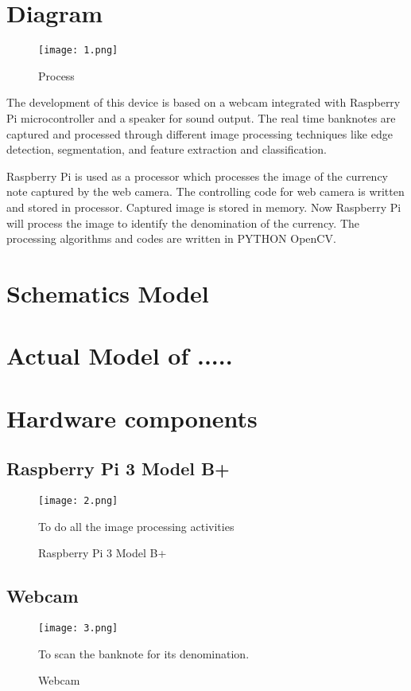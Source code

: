 \documentclass[a4paper,12pt]{report}
\begin{document}
\section{Diagram}
\begin{figure}[h]
	\centering
	\texttt{[image: 1.png]}
	\caption{\label{fig.1}Process}
\end{figure}
The development of this device is based on a webcam integrated with Raspberry Pi microcontroller and a speaker for sound output. The real time banknotes are captured and processed through different image processing techniques like edge detection, segmentation, and feature extraction and classification.

Raspberry Pi is used as a processor which processes the image of the currency note captured by the web camera. The controlling code for web camera is written and stored in processor. Captured image is stored in memory. Now Raspberry Pi will process the image to identify the denomination of the currency. The processing algorithms and codes are written in PYTHON OpenCV.  	

\section{Schematics Model}	

\section{Actual Model of .....}	 

 \clearpage \section{Hardware components} 
\subsection{Raspberry Pi 3 Model B+}
\begin{figure}[h]
	\centering
	\texttt{[image: 2.png]}
	\caption{\label{fig.2}Raspberry Pi 3 Model B+} 
	To do all the image processing activities
\end{figure}
\subsection{Webcam}
\begin{figure}[h]
	\centering
	\texttt{[image: 3.png]}
	\caption{\label{fig.3}Webcam} 
	To scan the banknote for its denomination.
\end{figure} \clearpage
\end{document}

